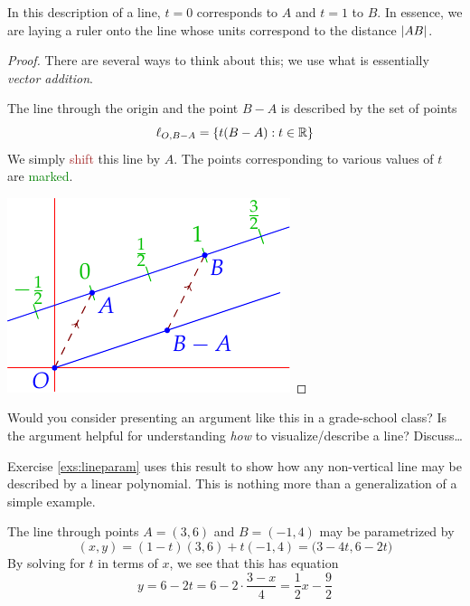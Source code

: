 In this description of a line, $t=0$ corresponds to $A$ and $t=1$ to $B$. In essence, we are laying a ruler onto the line whose units correspond to the distance $\left| AB\right|$.

\begin{proof}
	There are several ways to think about this; we use what is essentially \emph{vector addition}.\par
	\begin{minipage}[t]{0.65\linewidth}\vspace{-5pt}
	The line through the origin and the point $B-A$ is described by the set of points
	\[
		\ell_{O,B-A}=\{t(B-A):t\in\mathbb{R}\}
	\]
	We simply \textcolor{Brown}{shift} this line by $A$.
	\smallbreak
	The points corresponding to various values of $t$ are \textcolor{Green}{marked}.
	\end{minipage}
	\hfill
	\begin{minipage}[t]{0.34\linewidth}\vspace{0pt}
		\flushright
		\includegraphics{line-line2}
	\end{minipage}\smallbreak
\end{proof}

Would you consider presenting an argument like this in a grade-school class? Is the argument helpful for understanding \emph{how} to visualize/describe a line? Discuss\ldots

\goodbreak

Exercise \ref{exs:lineparam} uses this result to show how any non-vertical line may be described by a linear polynomial. This is nothing more than a generalization of a simple example.

\goodbreak


\begin{example}{}{}
	The line through points $A=(3,6)$ and $B=(-1,4)$ may be parametrized by
	\[
		(x,y)=(1-t)(3,6)+t(-1,4)=\bigl(3-4t,6-2t\bigr)
	\]
	By solving for $t$ in terms of $x$, we see that this has equation
	\[
		y=6-2t=6-2\cdot\frac{3-x}{4} =\frac 12x-\frac 92
	\]
\end{example}


